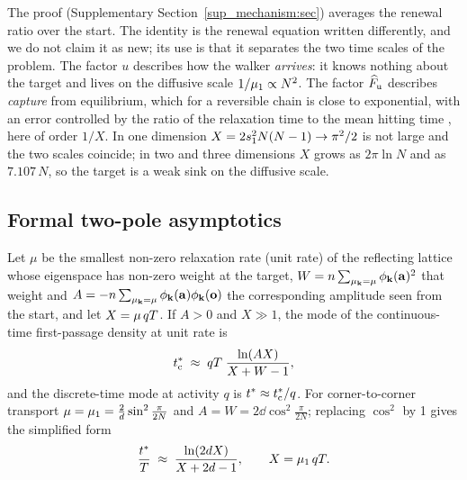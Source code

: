 The proof (Supplementary Section~\ref{sup_mechanism:sec}) averages the renewal ratio over the start. The identity is the
renewal equation written differently, and we do not claim it as new; its use is that it separates the two time scales
of the problem. The factor $u$ describes how the walker \emph{arrives}: it knows nothing about the target and lives on
the diffusive scale $1/\mu_{1}\propto N^{2}$. The factor $\widehat{F}_{\mathrm u}$ describes \emph{capture} from equilibrium,
which for a reversible chain is close to exponential, with an error controlled by the ratio of the relaxation time to
the mean hitting time \citep{AldousBrown1992}, here of order $1/X$. In one dimension $X=2s_{1}^{2}N(N-1)\to\pi^{2}/2$ is not
large and the two scales coincide; in two and three dimensions $X$ grows as $2\pi\ln N$ and as $7.107\,N$, so the target
is a weak sink on the diffusive scale.

\subsection{Formal two-pole asymptotics}\label{s6_mechanism:ssec-two-pole}

\begin{heuristic}\label{s6_mechanism:res-L1}
Let $\mu$ be the smallest non-zero relaxation rate (unit rate) of the reflecting lattice whose eigenspace has
non-zero weight at the target, $W=n\sum_{\mu_{\mathbf{k}}=\mu}\phi_{\mathbf{k}}(\mathbf{a})^{2}$ that weight and
$A=-n\sum_{\mu_{\mathbf{k}}=\mu}\phi_{\mathbf{k}}(\mathbf{a})\phi_{\mathbf{k}}(\mathbf{o})$ the corresponding amplitude seen from the start, and let
$X=\mu\,qT$. If $A>0$ and $X\gg1$, the mode of the continuous-time first-passage density at unit rate is
\begin{equation}\label{s6_mechanism:eq-L1}
  t^{*}_{\mathrm{c}}\;\approx\;qT\;\frac{\ln(A X)}{X+W-1},
\end{equation}
and the discrete-time mode at activity $q$ is $t^{*}\approx t^{*}_{\mathrm{c}}/q$. For corner-to-corner transport
$\mu=\mu_{1}=\tfrac{2}{d}\sin^{2}\tfrac{\pi}{2N}$ and $A=W=2\dd\cos^{2}\tfrac{\pi}{2N}$; replacing $\cos^{2}$ by 1 gives the
simplified form
\begin{equation}\label{s6_mechanism:eq-L1-simple}
  \frac{t^{*}}{T}\;\approx\;\frac{\ln(2d X)}{X+2d-1},\qquad X=\mu_{1}\,qT .
\end{equation}
\end{heuristic}

